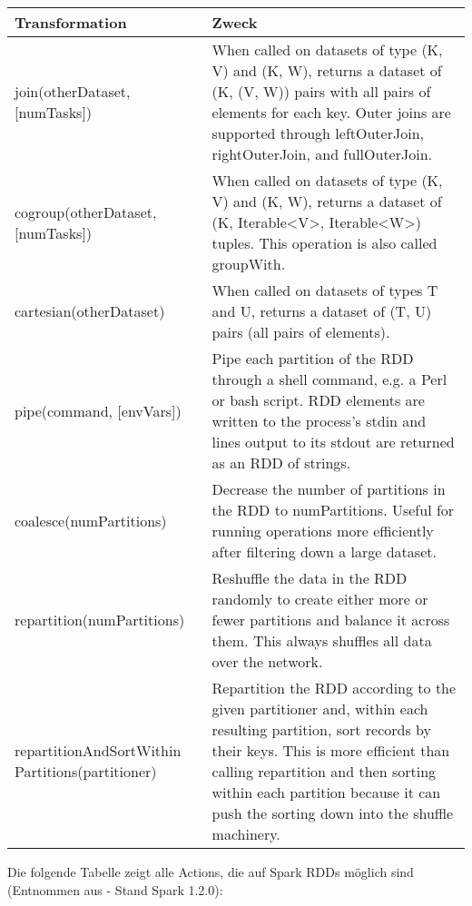 \begin{tabular}{| p{5cm} | p{8cm} | }
\hline
Transformation & Zweck \\ \hline \hline
join(otherDataset, [numTasks]) & When called on datasets of type (K, V) and (K, W), returns a dataset of (K, (V, W)) pairs with all pairs of elements for each key. Outer joins are supported through leftOuterJoin, rightOuterJoin, and fullOuterJoin. \\ \hline
cogroup(otherDataset, [numTasks]) & When called on datasets of type (K, V) and (K, W), returns a dataset of (K, Iterable<V>, Iterable<W>) tuples. This operation is also called groupWith. \\ \hline
cartesian(otherDataset) & When called on datasets of types T and U, returns a dataset of (T, U) pairs (all pairs of elements). \\ \hline
pipe(command, [envVars]) & Pipe each partition of the RDD through a shell command, e.g. a Perl or bash script. RDD elements are written to the process's stdin and lines output to its stdout are returned as an RDD of strings. \\ \hline
coalesce(numPartitions) & Decrease the number of partitions in the RDD to numPartitions. Useful for running operations more efficiently after filtering down a large dataset.  \\ \hline
repartition(numPartitions) & Reshuffle the data in the RDD randomly to create either more or fewer partitions and balance it across them. This always shuffles all data over the network.  \\ \hline
repartitionAndSortWithin Partitions(partitioner) & Repartition the RDD according to the given partitioner and, within each resulting partition, sort records by their keys. This is more efficient than calling repartition and then sorting within each partition because it can push the sorting down into the shuffle machinery.  \\ \hline


\end{tabular}

Die folgende Tabelle zeigt alle Actions, die auf Spark RDDs möglich sind (Entnommen aus  - Stand Spark 1.2.0):


